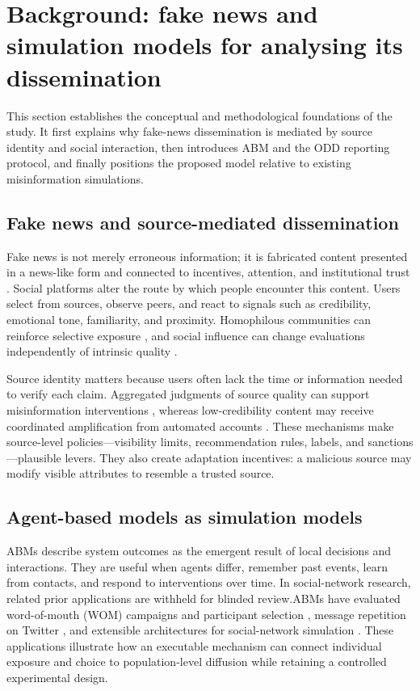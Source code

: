 \section{Background: fake news and simulation models for analysing its dissemination}

This section establishes the conceptual and methodological foundations of the study. It first explains why fake-news dissemination is mediated by source identity and social interaction, then introduces ABM and the ODD reporting protocol, and finally positions the proposed model relative to existing misinformation simulations.

\subsection{Fake news and source-mediated dissemination}

Fake news is not merely erroneous information; it is fabricated content presented in a news-like form and connected to incentives, attention, and institutional trust \citep{lazer2018,allcott2017}. Social platforms alter the route by which people encounter this content. Users select from sources, observe peers, and react to signals such as credibility, emotional tone, familiarity, and proximity. Homophilous communities can reinforce selective exposure \citep{delvicario2016}, and social influence can change evaluations independently of intrinsic quality \citep{muchnik2013}.

Source identity matters because users often lack the time or information needed to verify each claim. Aggregated judgments of source quality can support misinformation interventions \citep{pennycook2019}, whereas low-credibility content may receive coordinated amplification from automated accounts \citep{shao2018}. These mechanisms make source-level policies---visibility limits, recommendation rules, labels, and sanctions---plausible levers. They also create adaptation incentives: a malicious source may modify visible attributes to resemble a trusted source.

\subsection{Agent-based models as simulation models}

ABMs describe system outcomes as the emergent result of local decisions and interactions. They are useful when agents differ, remember past events, learn from contacts, and respond to interventions over time. In social-network research, \ifdefined\ANONYMOUS related prior applications are withheld for blinded review.\else ABMs have evaluated word-of-mouth (WOM) campaigns and participant selection \citep{leger2016,plaza2019}, message repetition on Twitter \citep{lopez2023}, and extensible architectures for social-network simulation \citep{leger2026}.\fi{} These applications illustrate how an executable mechanism can connect individual exposure and choice to population-level diffusion while retaining a controlled experimental design.

